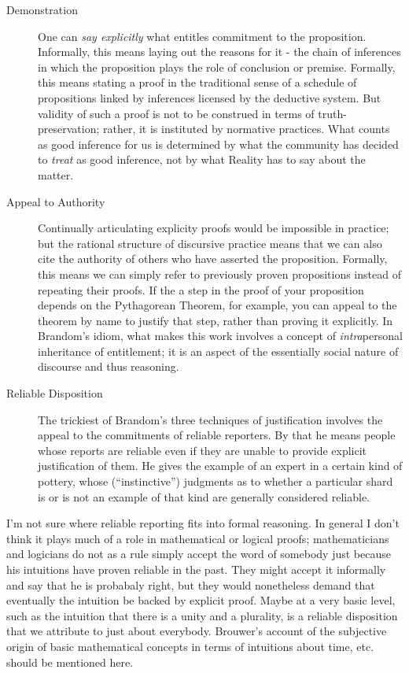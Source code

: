 \begin{description}
\item [Demonstration] One can \emph{say explicitly} what entitles
  commitment to the proposition.  Informally, this means laying out
  the reasons for it - the chain of inferences in which the
  proposition plays the role of conclusion or premise.  Formally,
  this means stating a proof in the traditional sense of a schedule of
  propositions linked by inferences licensed by the deductive system.
  But validity of such a proof is not to be construed in terms of
  truth-preservation; rather, it is instituted by normative practices.
  What counts as good inference for us is determined by what the
  community has decided to \emph{treat} as good inference, not by what
  Reality has to say about the matter.

\item [Appeal to Authority] Continually articulating explicity proofs
  would be impossible in practice; but the rational structure of
  discursive practice means that we can also cite the authority of
  others who have asserted the proposition.  Formally, this means we
  can simply refer to previously proven propositions instead of
  repeating their proofs.  If the a step in the proof of your
  proposition depends on the Pythagorean Theorem, for example, you can
  appeal to the theorem by name to justify that step, rather than
  proving it explicitly.  In Brandom's idiom, what makes this work
  involves a concept of \emph{intra}personal inheritance of
  entitlement; it is an aspect of the essentially social nature of
  discourse and thus reasoning.

\item [Reliable Disposition] The trickiest of Brandom's three
  techniques of justification involves the appeal to the commitments
  of reliable reporters.  By that he means people whose reports are
  reliable even if they are unable to provide explicit justification
  of them.  He gives the example of an expert in a certain kind of
  pottery, whose (``instinctive'') judgments as to whether a
  particular shard is or is not an example of that kind are generally
  considered reliable.
\end{description}

\begin{ednote}
  I'm not sure where reliable reporting fits into formal reasoning.
  In general I don't think it plays much of a role in mathematical or
  logical proofs; mathematicians and logicians do not as a rule simply
  accept the word of somebody just because his intuitions have proven
  reliable in the past.  They might accept it informally and say that
  he is probabaly right, but they would nonetheless demand that
  eventually the intuition be backed by explicit proof.  Maybe at a
  very basic level, such as the intuition that there is a unity and a
  plurality, is a reliable disposition that we attribute to just about
  everybody.  Brouwer's account of the subjective origin of basic
  mathematical concepts in terms of intuitions about time, etc. should
  be mentioned here.
\end{ednote}

